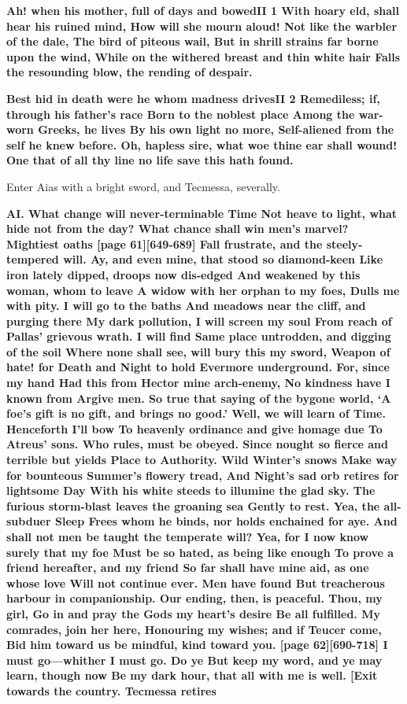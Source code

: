 \documentclass[11pt,letter]{book}
\begin{document}
\par \textbf{Ah! when his mother, full of days and bowedII 1 With hoary eld, shall hear his ruined mind, How will she mourn aloud! Not like the warbler of the dale, The bird of piteous wail, But in shrill strains far borne upon the wind, While on the withered breast and thin white hair Falls the resounding blow, the rending of despair.}
\par 

\par \textbf{Best hid in death were he whom madness drivesII 2 Remediless; if, through his father’s race Born to the noblest place Among the war-worn Greeks, he lives By his own light no more, Self-aliened from the self he knew before. Oh, hapless sire, what woe thine ear shall wound! One that of all thy line no life save this hath found.}
\par 

\par  Enter Aias with a bright sword, and Tecmessa, severally.

\par \textbf{AI. What change will never-terminable Time Not heave to light, what hide not from the day? What chance shall win men’s marvel? Mightiest oaths [page 61][649-689] Fall frustrate, and the steely-tempered will. Ay, and even mine, that stood so diamond-keen Like iron lately dipped, droops now dis-edged And weakened by this woman, whom to leave A widow with her orphan to my foes, Dulls me with pity. I will go to the baths And meadows near the cliff, and purging there My dark pollution, I will screen my soul From reach of Pallas’ grievous wrath. I will find Same place untrodden, and digging of the soil Where none shall see, will bury this my sword, Weapon of hate! for Death and Night to hold Evermore underground. For, since my hand Had this from Hector mine arch-enemy, No kindness have I known from Argive men. So true that saying of the bygone world, ‘A foe’s gift is no gift, and brings no good.’ Well, we will learn of Time. Henceforth I’ll bow To heavenly ordinance and give homage due To Atreus’ sons. Who rules, must be obeyed. Since nought so fierce and terrible but yields Place to Authority. Wild Winter’s snows Make way for bounteous Summer’s flowery tread, And Night’s sad orb retires for lightsome Day With his white steeds to illumine the glad sky. The furious storm-blast leaves the groaning sea Gently to rest. Yea, the all-subduer Sleep Frees whom he binds, nor holds enchained for aye. And shall not men be taught the temperate will? Yea, for I now know surely that my foe Must be so hated, as being like enough To prove a friend hereafter, and my friend So far shall have mine aid, as one whose love Will not continue ever. Men have found But treacherous harbour in companionship. Our ending, then, is peaceful. Thou, my girl, Go in and pray the Gods my heart’s desire Be all fulfilled. My comrades, join her here, Honouring my wishes; and if Teucer come, Bid him toward us be mindful, kind toward you. [page 62][690-718] I must go—whither I must go. Do ye But keep my word, and ye may learn, though now Be my dark hour, that all with me is well. [Exit towards the country. Tecmessa retires}
\par 
\end{document}
